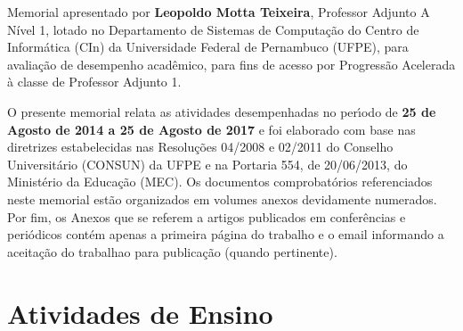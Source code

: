 \documentclass[a4paper,oneside,10pt]{article}
\newcounter{document}%
\begin{document}
\begin{onehalfspace}

Memorial apresentado por \textbf{Leopoldo Motta Teixeira}, Professor Adjunto A Nível 1, lotado no Departamento de Sistemas de Computação do Centro de Inform\'{a}tica (CIn) da Universidade Federal de Pernambuco (UFPE), para avalia\c{c}\~{a}o de desempenho acad\^{e}mico, para fins de acesso por Progress\~{a}o Acelerada \`{a} classe de Professor Adjunto 1.

O presente memorial relata as atividades desempenhadas no per\'{\i}odo de \textbf{25 de Agosto de 2014 a 25 de Agosto de 2017} e foi elaborado com base nas diretrizes estabelecidas nas Resolu\c{c}\~{o}es 04/2008 e 02/2011 do Conselho Universit\'{a}rio (CONSUN) da UFPE e na Portaria 554, de 20/06/2013, do Minist\'{e}rio da Educa\c{c}\~{a}o (MEC). Os documentos comprobat\'{o}rios referenciados neste memorial est\~{a}o organizados em volumes anexos devidamente numerados. Por fim, os Anexos que se referem a artigos publicados em confer\^{e}ncias e peri\'{o}dicos cont\'{e}m apenas a primeira p\'{a}gina do trabalho e o email informando a aceita\c{c}\~{a}o do trabalhao para publica\c{c}\~{a}o (quando pertinente).

\end{onehalfspace}

%
%
%
%


\newpage
\section{Atividades de Ensino}
\end{document}
